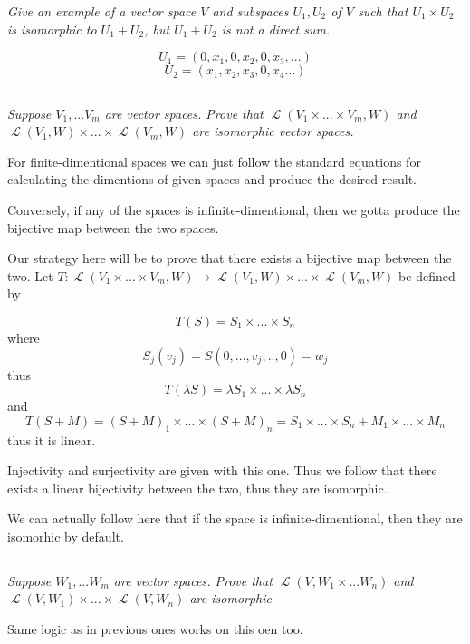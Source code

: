\documentclass[11pt,oneside,titlepage]{book}
\DeclareMathOperator \map {\mathcal {L}}
\begin{document}
\textit{Give an example of a vector space $V$ and subspaces $U_1, U_2$ of $V$ such that
  $U_1 \times U_2$ is isomorphic to $U_1 + U_2$, but $U_1 + U_2$ is not a direct sum.}

$$U_1 = (0, x_1, 0, x_2, 0, x_3, ...)$$
$$U_2 = (x_1, x_2, x_3, 0, x_4 ...)$$

\subsection{}

\textit{Suppose $V_1, ... V_m$ are vector spaces. Prove that $\map(V_1 \times ... \times V_m, W)$
  and $\map(V_1, W) \times ... \times \map(V_m, W)$ are isomorphic vector spaces.}

For finite-dimentional spaces we can just follow the standard equations for calculating the
dimentions of given spaces and produce the desired result.


Conversely, if any of the spaces is infinite-dimentional, then we gotta produce the bijective
map between the two spaces.


Our strategy here will be to prove that there exists a bijective map between the two.
Let $T: \map(V_1 \times ... \times V_m, W) \to \map(V_1, W) \times ... \times \map(V_m, W)$
be defined by

$$T(S) = S_1 \times ... \times S_n$$
where
$$S_j(v_j) = S(0, ..., v_j, .., 0) = w_j$$
thus
$$T(\lambda S) = \lambda S_1 \times ... \times \lambda S_n$$
and
$$T(S + M) = (S + M)_1 \times ... \times (S + M)_n = S_1 \times ... \times S_n +
M_1 \times ... \times M_n$$
thus it is linear.

Injectivity and surjectivity are given with this one. Thus we follow that there exists a linear
bijectivity between the two, thus they are isomorphic.

We can actually follow here that if the space is infinite-dimentional, then they are isomorhic
by default.

\subsection{}

\textit{Suppose $W_1, ... W_m$ are vector spaces. Prove that
  $\map(V, W_1 \times  ... W_n)$ and $\map(V, W_1) \times ... \times \map(V, W_n)$ are isomorphic }

Same logic as in previous ones works on this oen too.

\subsection{}
\end{document}
